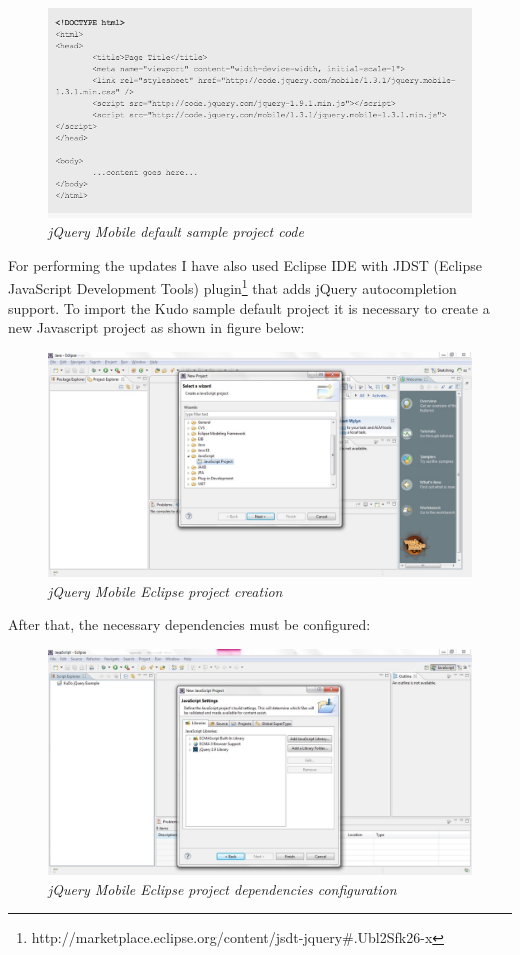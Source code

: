 \documentclass[a4paper,12pt]{book}
\begin{document}
\begin{figure}[H]
    \centering
    \includegraphics[width=12cm, keepaspectratio]{img/jquery1.png}
    \caption{\textit{jQuery Mobile default sample project code}}
 \end{figure}
 
For performing the updates I have also used Eclipse IDE with JDST (Eclipse JavaScript Development Tools) plugin\footnote{http://marketplace.eclipse.org/content/jsdt-jquery\#.Ubl2Sfk26-x} that adds jQuery autocompletion support. To import the Kudo sample default project it is necessary to create a new Javascript project as shown in figure below:

\begin{figure}[H]
    \centering
    \includegraphics[width=12cm, keepaspectratio]{img/jquery3.png}
    \caption{\textit{jQuery Mobile Eclipse project creation}}
 \end{figure}

After that, the necessary dependencies must be configured:

\begin{figure}[H]
    \centering
    \includegraphics[width=12cm, keepaspectratio]{img/jquery4.png}
    \caption{\textit{jQuery Mobile Eclipse project dependencies configuration}}
 \end{figure}
\end{document}
